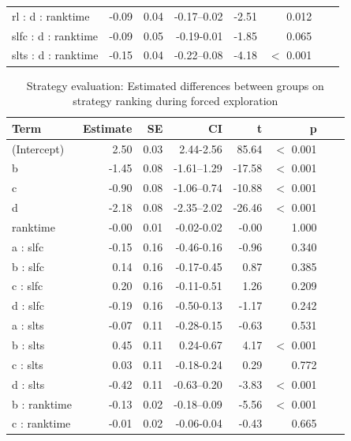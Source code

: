 \documentclass[pdflatex,sn-nature]{sn-jnl}%
\theoremstyle{thmstyleone}%
\theoremstyle{thmstyletwo}%
\theoremstyle{thmstylethree}%
\begin{document}
\begin{appendices}
\begin{table}[h!]
\begin{tabular}{lrrrrrrr}
  rl : d : ranktime & -0.09 & 0.04 & -0.17--0.02 & -2.51 &    0.012 \\ 
  slfc : d : ranktime & -0.09 & 0.05 & -0.19-0.01 & -1.85 &    0.065 \\ 
  slts : d : ranktime & -0.15 & 0.04 & -0.22--0.08 & -4.18 &  $<$  0.001 \\ 
   \hline
\end{tabular}
\end{table}


\begin{table}[h!]
\caption{Strategy evaluation: Estimated differences between groups on strategy ranking during forced exploration}\label{table_strategyevaluation_diffgroup}
\centering
\begin{tabular}{lrrrrrrr}
  \hline
 Term & Estimate & SE & CI & t & p \\ 
  \hline
 (Intercept) & 2.50 & 0.03 & 2.44-2.56 & 85.64 &  $<$  0.001 \\ 
   b & -1.45 & 0.08 & -1.61--1.29 & -17.58 &  $<$  0.001 \\ 
   c & -0.90 & 0.08 & -1.06--0.74 & -10.88 &  $<$  0.001 \\ 
   d & -2.18 & 0.08 & -2.35--2.02 & -26.46 &  $<$  0.001 \\ 
   ranktime & -0.00 & 0.01 & -0.02-0.02 & -0.00 &    1.000 \\ 
   a : slfc & -0.15 & 0.16 & -0.46-0.16 & -0.96 &    0.340 \\ 
   b : slfc & 0.14 & 0.16 & -0.17-0.45 & 0.87 &    0.385 \\ 
   c : slfc & 0.20 & 0.16 & -0.11-0.51 & 1.26 &    0.209 \\ 
   d : slfc & -0.19 & 0.16 & -0.50-0.13 & -1.17 &    0.242 \\ 
   a : slts & -0.07 & 0.11 & -0.28-0.15 & -0.63 &    0.531 \\ 
   b : slts & 0.45 & 0.11 & 0.24-0.67 & 4.17 &  $<$  0.001 \\ 
   c : slts & 0.03 & 0.11 & -0.18-0.24 & 0.29 &    0.772 \\ 
   d : slts & -0.42 & 0.11 & -0.63--0.20 & -3.83 &  $<$  0.001 \\ 
   b : ranktime & -0.13 & 0.02 & -0.18--0.09 & -5.56 &  $<$  0.001 \\ 
   c : ranktime & -0.01 & 0.02 & -0.06-0.04 & -0.43 &    0.665 \\ 

\end{tabular}
\end{table}
\end{appendices}
\end{document}
